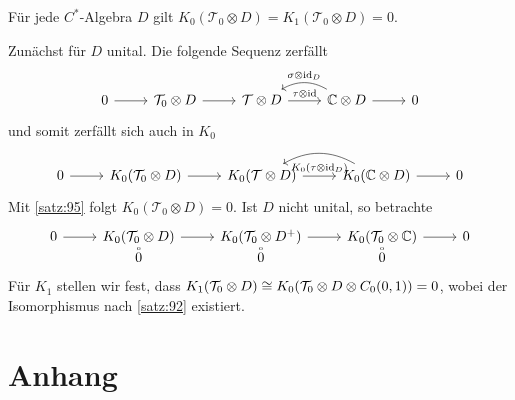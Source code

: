\begin{korollar}
	Für jede $C^*$-Algebra $D$ gilt $K_0(\mathcal{T}_0 \otimes D) = K_1(\mathcal{T}_0 \otimes D) = 0$.
\end{korollar}
\begin{beweis}
	Zunächst für $D$ unital.
	Die folgende Sequenz zerfällt
	\[
		\begin{tikzcd}
			0 \rar & \mathcal{T}_0 \otimes D \rar & \mathcal{T} \otimes D \rar["\tau \otimes {\id}"] & \mathbb{C} \otimes D \rar \lar[bend right,"\sigma \otimes {\id_D}"'] & 0
		\end{tikzcd}
	\]
	und somit zerfällt sich auch in $K_0$
	\[
		\begin{tikzcd}
			0 \rar & K_0(\mathcal{T}_0 \otimes D) \rar & K_0(\mathcal{T} \otimes D) \rar["K_0(\tau \otimes {\id_D})"] & K_0(\mathbb{C} \otimes D) \lar[bend right] \rar & 0
		\end{tikzcd}
	\]
	Mit \autoref{satz:95} folgt $K_0(\mathcal{T}_0 \otimes D)=0$.
	Ist $D$ nicht unital, so betrachte
	\[
		\begin{tikzcd}[row sep=small]
			0 \rar & K_0(\mathcal{T}_0 \otimes D) \rar & K_0 \enbrace*{\mathcal{T}_0 \otimes D^+} \rar & K_0(\mathcal{T}_0 \otimes \mathbb{C}) \rar & 0 \\[-1em]
			& 0 \uar[equal] & \uar[equal]0  & \uar[equal] 0
		\end{tikzcd}
	\]
	Für $K_1$ stellen wir fest, dass $K_1(\mathcal{T}_0 \otimes D) \cong K_0 \enbrace*{\mathcal{T}_0 \otimes D \otimes C_0(0,1)} = 0$, wobei der Isomorphismus nach \autoref{satz:92} existiert.
\end{beweis}


\cleardoubleoddemptypage
{}
\setcounter{page}{1}
\cleardoubleoddemptypage
\appendix

\section{Anhang} %
\label{sec:anhang}

\printindex
\printbibliography
\listoffigures
\todototoc
{}

